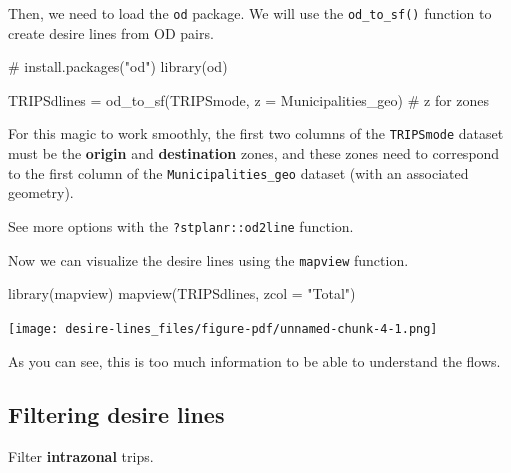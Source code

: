 \documentclass[
  letterpaper,
  DIV=11,
  numbers=noendperiod]{scrreprt}
\newenvironment{Shaded}{\begin{snugshade}}{\end{snugshade}}
\newcommand{\AttributeTok}[1]{\textcolor[rgb]{0.40,0.45,0.13}{#1}}
\newcommand{\CommentTok}[1]{\textcolor[rgb]{0.37,0.37,0.37}{#1}}
\newcommand{\FunctionTok}[1]{\textcolor[rgb]{0.28,0.35,0.67}{#1}}
\newcommand{\NormalTok}[1]{\textcolor[rgb]{0.00,0.23,0.31}{#1}}
\newcommand{\OtherTok}[1]{\textcolor[rgb]{0.00,0.23,0.31}{#1}}
\newcommand{\StringTok}[1]{\textcolor[rgb]{0.13,0.47,0.30}{#1}}
\begin{document}
Then, we need to load the \texttt{od} package. We will use the
\texttt{od\_to\_sf()} function to create desire lines from OD pairs.

\begin{Shaded}
\begin{Highlighting}[]
\CommentTok{\# install.packages("od")}
\FunctionTok{library}\NormalTok{(od)}

\NormalTok{TRIPSdlines }\OtherTok{=} \FunctionTok{od\_to\_sf}\NormalTok{(TRIPSmode, }\AttributeTok{z =}\NormalTok{ Municipalities\_geo) }\CommentTok{\# z for zones}
\end{Highlighting}
\end{Shaded}

For this magic to work smoothly, the first two columns of the
\texttt{TRIPSmode} dataset must be the \textbf{origin} and
\textbf{destination} zones, and these zones need to correspond to the
first column of the \texttt{Municipalities\_geo} dataset (with an
associated geometry).

\begin{tcolorbox}[enhanced jigsaw, breakable, left=2mm, colframe=quarto-callout-tip-color-frame, leftrule=.75mm, bottomrule=.15mm, arc=.35mm, rightrule=.15mm, colback=white, opacityback=0, toprule=.15mm]

See more options with the \texttt{?stplanr::od2line} function.

\end{tcolorbox}

Now we can visualize the desire lines using the \texttt{mapview}
function.

\begin{Shaded}
\begin{Highlighting}[]
\FunctionTok{library}\NormalTok{(mapview)}
\FunctionTok{mapview}\NormalTok{(TRIPSdlines, }\AttributeTok{zcol =} \StringTok{"Total"}\NormalTok{)}
\end{Highlighting}
\end{Shaded}

\texttt{[image: desire-lines\_files/figure-pdf/unnamed-chunk-4-1.png]}

As you can see, this is too much information to be able to understand
the flows.

\subsection{Filtering desire lines}\label{filtering-desire-lines}

Filter \textbf{intrazonal} trips.
\end{document}
